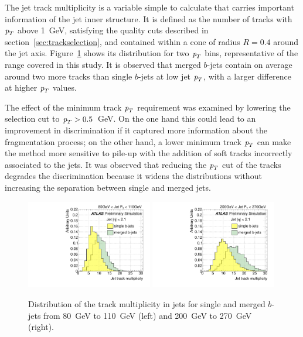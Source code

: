 The jet track multiplicity is a variable simple to calculate that carries important information of the jet inner structure. It is defined as the number of tracks with ${\emph{p}_{T}}$ above 1~GeV, satisfying the quality cuts described in section~\ref{sec:trackselection}, and contained within a cone of radius $R=0.4$ around the jet axis.  Figure~\ref{fig:ntrksinglemerged} shows its distribution for two ${\emph{p}_{T}}$ bins, representative of the range covered in this study.  It is observed that merged $b$-jets contain on average around two more tracks than single $b$-jets at low jet ${\emph{p}_{T}}$, with a larger difference at higher ${\emph{p}_{T}}$ values. 

The effect of the minimum track ${\emph{p}_{T}}$ requirement was examined by lowering the selection cut to ${\emph{p}_{T}} > 0.5$~GeV. On the one hand this could lead to an improvement in discrimination if it captured more information about the fragmentation process; on the other hand, a lower minimum track ${\emph{p}_{T}}$ can make the method more sensitive to pile-up with the addition of soft tracks incorrectly associated to the jets.
It was observed that reducing the ${\emph{p}_{T}}$ cut of the tracks degrades the discrimination because it widens the distributions without increasing the separation between single and merged jets. 

\begin{figure}[tp]
\centering
\includegraphics[width=0.49\textwidth]{FIGS/VarsSingleMerged/Ntrk080.pdf}
\includegraphics[width=0.49\textwidth]{FIGS/VarsSingleMerged/Ntrk200.pdf}
\caption{Distribution of the track multiplicity in jets for single and merged $b$-jets from 80~GeV to 110~GeV (left) and 200~GeV to 270~GeV (right).}
\label{fig:ntrksinglemerged}
\end{figure}


